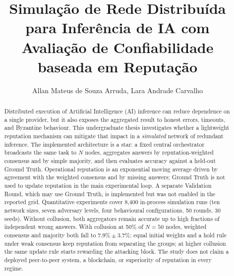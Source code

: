 \documentclass[12pt]{article}
\title{Simulação de Rede Distribuída para Inferência de IA com Avaliação de Confiabilidade baseada em Reputação}
\author{Allan Mateus de Souza Arruda\inst{1}, Lara Andrade Carvalho\inst{1}}
\begin{document}
\maketitle

\begin{abstract}
  Distributed execution of Artificial Intelligence (AI) inference can reduce dependence on a single provider, but it also exposes the aggregated result to honest errors, timeouts, and Byzantine behaviour. This undergraduate thesis investigates whether a lightweight reputation mechanism can mitigate that impact in a \emph{simulated} network of redundant inference. The implemented architecture is a star: a fixed central orchestrator broadcasts the same task to $N$ nodes, aggregates answers by reputation-weighted consensus and by simple majority, and then evaluates accuracy against a held-out Ground Truth. Operational reputation is an exponential moving average driven by agreement with the weighted consensus and by missing answers; Ground Truth is not used to update reputation in the main experimental loop. A separate Validation Round, which may use Ground Truth, is implemented but was not enabled in the reported grid. Quantitative experiments cover 8{,}400 in-process simulation runs (ten network sizes, seven adversary levels, four behavioural configurations, 50 rounds, 30 seeds). Without collusion, both aggregators remain accurate up to high fractions of independent wrong answers. With collusion at 50\% of $N=50$ nodes, weighted consensus and majority both fall to $7.9\%\pm 3.7\%$: equal initial weights and a hold rule under weak consensus keep reputation from separating the groups; at higher collusion the same update rule starts rewarding the attacking block. The study does not claim a deployed peer-to-peer system, a blockchain, or superiority of reputation in every regime.
\end{abstract}
\end{document}
